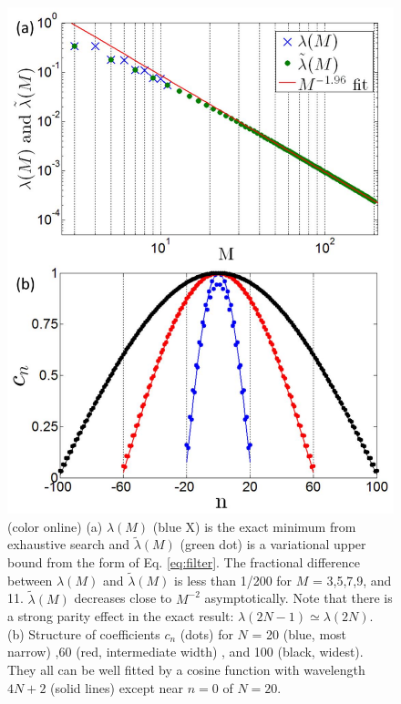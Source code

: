 \documentclass[twocolumn,superscriptaddress, prb]{revtex4-1}
\begin{document}
%


\begin{figure}
\includegraphics[width=0.95\linewidth]{fig_floquet.pdf}
\centering
\caption{(color online) (a) $\lambda(M)$ (blue X) is the exact minimum from exhaustive search and $\tilde{\lambda}(M)$ (green dot) is a variational upper bound from the form of Eq. \eqref{eq:filter}. The fractional difference between $\lambda(M)$ and $\tilde{\lambda}(M)$ is less than 1/200 for $M$ = 3,5,7,9, and 11. $\tilde{\lambda}(M)$ decreases close to $M^{-2}$ asymptotically. Note that there is a strong parity effect in the exact result: $\lambda(2N-1) \simeq \lambda(2N)$.
(b) Structure of coefficients $c_n$ (dots) for $N$ = 20 (blue, most narrow) ,60 (red, intermediate width) , and 100 (black, widest). They all can be well fitted by a cosine function with wavelength $4N+2$ (solid lines) except near $n = 0$ of $N = 20$. }
\label{fig:floquet}
\end{figure}
\end{document}
